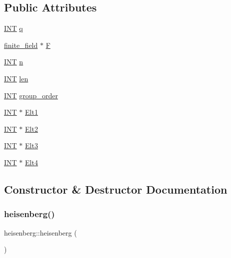 \subsection*{Public Attributes}
\begin{DoxyCompactItemize}
\item 
\mbox{\hyperlink{galois_8h_a09fddde158a3a20bd2dcadb609de11dc}{I\+NT}} \mbox{\hyperlink{classheisenberg_af9e931f2bc1ca76d4c28d1bf8ea3c794}{q}}
\item 
\mbox{\hyperlink{classfinite__field}{finite\+\_\+field}} $\ast$ \mbox{\hyperlink{classheisenberg_aeabec971ff171af2bbd41b2f64bd2e3a}{F}}
\item 
\mbox{\hyperlink{galois_8h_a09fddde158a3a20bd2dcadb609de11dc}{I\+NT}} \mbox{\hyperlink{classheisenberg_a5f434f747ceebaede3371d5e265c40e0}{n}}
\item 
\mbox{\hyperlink{galois_8h_a09fddde158a3a20bd2dcadb609de11dc}{I\+NT}} \mbox{\hyperlink{classheisenberg_a9b4d0cf0672b763bda59a411ab307b30}{len}}
\item 
\mbox{\hyperlink{galois_8h_a09fddde158a3a20bd2dcadb609de11dc}{I\+NT}} \mbox{\hyperlink{classheisenberg_ae53b7d9155e9328b88ec79ecdd57b915}{group\+\_\+order}}
\item 
\mbox{\hyperlink{galois_8h_a09fddde158a3a20bd2dcadb609de11dc}{I\+NT}} $\ast$ \mbox{\hyperlink{classheisenberg_a6020d937f6761e6c392fe4f3c4b65755}{Elt1}}
\item 
\mbox{\hyperlink{galois_8h_a09fddde158a3a20bd2dcadb609de11dc}{I\+NT}} $\ast$ \mbox{\hyperlink{classheisenberg_a681a960e90968d4af527c4247dc4cb61}{Elt2}}
\item 
\mbox{\hyperlink{galois_8h_a09fddde158a3a20bd2dcadb609de11dc}{I\+NT}} $\ast$ \mbox{\hyperlink{classheisenberg_a04d358f005654f254fbe2613e298c77a}{Elt3}}
\item 
\mbox{\hyperlink{galois_8h_a09fddde158a3a20bd2dcadb609de11dc}{I\+NT}} $\ast$ \mbox{\hyperlink{classheisenberg_a117595bc25653670984daed9a53a9324}{Elt4}}
\end{DoxyCompactItemize}


\subsection{Constructor \& Destructor Documentation}
\mbox{\label{classheisenberg_a3b84a07f0f518ca32ffb17c8114a3bb7}} 
\subsubsection{\texorpdfstring{heisenberg()}{heisenberg()}}
{\footnotesize\ttfamily heisenberg\+::heisenberg (\begin{DoxyParamCaption}{ }\end{DoxyParamCaption})}

